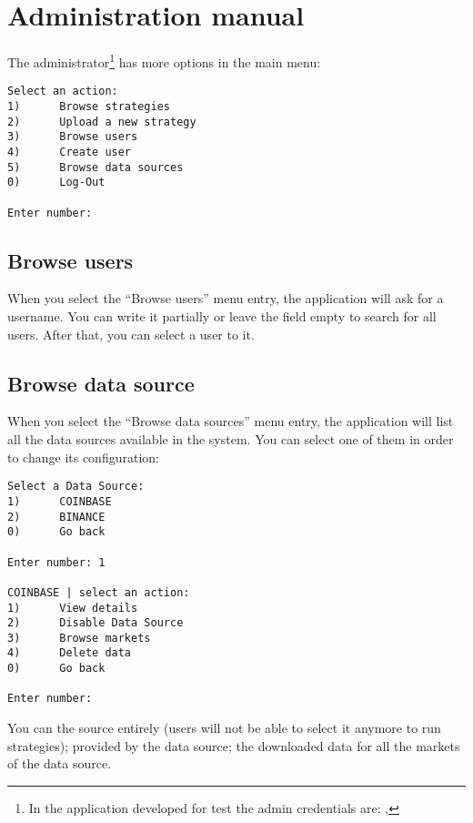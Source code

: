 \section{Administration manual}\label{sec:adminmanual}

The administrator\footnote{In the application developed for test the admin
credentials are: , } has more options in the main menu:

\begin{verbatim}
Select an action:
1)      Browse strategies
2)      Upload a new strategy
3)      Browse users
4)      Create user
5)      Browse data sources
0)      Log-Out

Enter number:
\end{verbatim}

\subsection{Browse users}

When you select the ``Browse users'' menu entry, the application will ask for a
username. You can write it partially or leave the field empty to search for all
users. After that, you can select a user to  it.

\subsection{Browse data source}

When you select the ``Browse data sources'' menu entry, the application will
list all the data sources available in the system. You can select one of them in
order to change its configuration:

\begin{verbatim}
Select a Data Source:
1)      COINBASE
2)      BINANCE
0)      Go back

Enter number: 1

COINBASE | select an action:
1)      View details
2)      Disable Data Source
3)      Browse markets
4)      Delete data
0)      Go back

Enter number:
\end{verbatim}

You can  the source entirely (users will not be able to select
it anymore to run strategies);  provided by
the data source;  the downloaded data for all the markets of
the data source.

